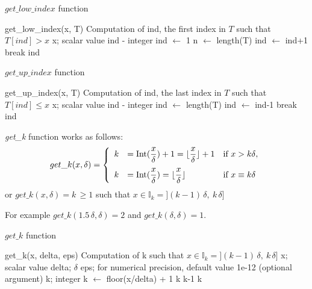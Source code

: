 \documentclass{article}
\newcommand{\be}{\begin{eqnarray*}}
\newcommand{\ee}{\end{eqnarray*}}
\newcommand{\dsp}{\displaystyle}
\def\Ik{\mathbb{I}_k}
\begin{document}
\begin{algorithm}[!h]
\caption{$get\_low\_index$ function}
\begin{algorithmic}[1] 
\Use get\_low\_index(x, T)
  \Desc Computation of ind, the first index in $T$ such that $T[ind]> x$
  \Input x; scalar value
\Output ind - integer
\State ind $\gets$ 1
\State n $\gets$ length(T)
\State ind $\gets$ ind+1
\Else
\State break
\EndIf
\EndWhile
\State \Return ind
\end{algorithmic}
\end{algorithm}

\begin{algorithm}[!h]
\caption{$get\_up\_index$ function}
\begin{algorithmic}[1] 
\Use get\_up\_index(x, T)
  \Desc Computation of ind, the last index in $T$ such that $T[ind]\leq x$
  \Input x; scalar value
\Output ind - integer
\State ind $\gets$ length(T)
\State ind $\gets$ ind-1
\Else
\State break
\EndIf
\EndWhile
\State \Return ind
\end{algorithmic}
\end{algorithm}

\textit{get\_k} function works as follows:
\be
get\_k(x, \delta) = \left\{
\begin{array}{lll}
k&= \hbox{Int}(\dsp\frac{x}{\delta})+1 = \lfloor\dsp\frac{x}{\delta} \rfloor+1 &\hbox{if } {x > k\delta},\\[10pt]
k &= \hbox{Int}(\dsp\frac{x}{\delta}) = \lfloor\dsp\frac{x}{\delta} \rfloor &\hbox{if }{x \equiv k\delta}
\end{array}
\right.
\ee
or $get\_k(x,\delta) = k\, \geq 1$ such that $x \in \Ik=]{(k-1)}\,\delta,\:k\,\delta]$

For example $get\_k(1.5\,\delta, \delta)= 2$ and $get\_k(\delta, \delta)= 1$.

\begin{algorithm}[!h]
\caption{$get\_k$ function}
\begin{algorithmic}[1] 
\Use get\_k(x, delta, eps)
  \Desc Computation of k such that $x \in \Ik=]{(k-1)}\,\delta,\:k\,\delta]$
  \Input x; scalar value
\Input delta; $\delta$
\Input eps; for numerical precision, default value 1e-12 (optional argument)
\Output k; integer
\State k $\gets$ floor(x/delta) + 1
\State \Return k
\EndIf
{}
\State \Return k-1
\EndIf
\State \Return k
\end{algorithmic}
\end{algorithm}
\end{document}
